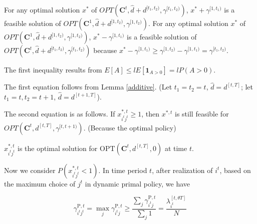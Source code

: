 For any optimal solution $x^{*}$ of $OPT(\bm{C}^{t}, \hat{d}+d^{[t_1, t_2)}, \gamma^{[t_1, t_2)})$, $x^{*} + \gamma^{[1, t_1)}$ is a feasible solution of $OPT(\bm{C}^{1}, \hat{d}+d^{[1, t_2)}, \gamma^{[1, t_2)})$. For any optimal solution $x^{*}$ of $OPT(\bm{C}^{1}, \hat{d}+d^{[1, t_2)}, \gamma^{[1, t_2)})$, $x^{*}- \gamma^{[1, t_1)}$ is a feasible solution of $OPT(\bm{C}^{t}, \hat{d}+d^{[t_1, t_2)}, \gamma^{[t_1, t_2)})$ because $x^{*}- \gamma^{[1, t_1)} \geq \gamma^{[1, t_{2})}- \gamma^{[1, t_1)} = \gamma^{[t_1, t_2)}$.


The first inequality results from $E[A] \leq l E[\bm{1}_{A>0}] = l P(A>0)$.

The first equation follows from Lemma \ref{additive}. (Let $t_1 = t_2 = t$, $\hat{d} = d^{[t, T]}$; let $t_1 = t, t_2 = t+1$, $\hat{d} = d^{[t+1, T]}$).

The second equation is as follows. If $x_{i^{t}j^{t}}^{*,t} \geq 1$, then $x^{*,t}$ is still feasible for $OPT(\bm{C}^{t}, d^{[t, T]}, \gamma^{[t,t+1)})$. (Because the optimal policy)

$x_{i^{t}j^{t}}^{*,t}$ is the optimal solution for $\text{OPT}(\bm{C}^{t}, d^{[t, T]}, 0)$ at time $t$.

Now we consider $P(x_{i^{t}j^{t}}^{*,t} <1)$. In time period $t$, after realization of $i^{t}$, based on the maximum choice of $j^{t}$ in dynamic primal policy, we have

$$
\gamma_{i^t j^t}^{\mathrm{P}, t}=\max_{j} \gamma_{i^t j}^{\mathrm{P}, t} \geqslant \frac{\sum_{j} \gamma_{i^t j}^{\mathrm{P}, t}}{\sum_{j} 1} = \frac{\lambda_{i^t}^{[t, \theta T]}}{N}
$$


